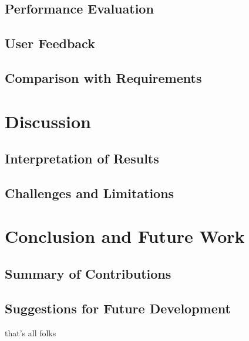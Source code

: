 \documentclass[conference, onecolumn]{IEEEtran}
\begin{document}
  \subsection{Performance Evaluation}
  \label{subsec:performance-evaluation}

  \subsection{User Feedback}
  \label{subsec:user-feedback}

  \subsection{Comparison with Requirements}
  \label{subsec:comparison-requirements}

  \section{Discussion}
  \label{sec:discussion}

  \subsection{Interpretation of Results}
  \label{subsec:interpretation-results}

  \subsection{Challenges and Limitations}
  \label{subsec:challenges-limitations}

  \section{Conclusion and Future Work}
  \label{sec:conclusion}

  \subsection{Summary of Contributions}
  \label{subsec:summary-contributions}

  \subsection{Suggestions for Future Development}
  \label{subsec:suggestions-future-development}

  \printbibliography



that's all folks
\end{document}
